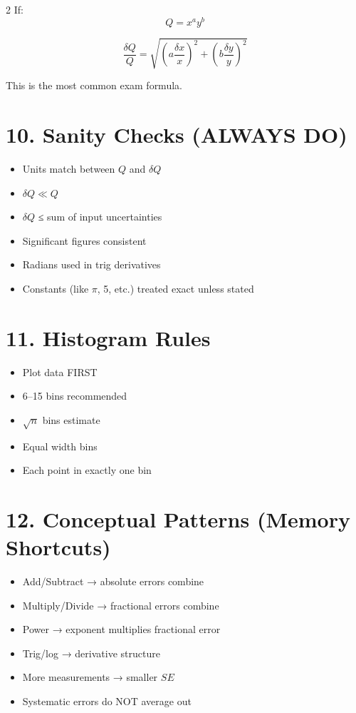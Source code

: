 \documentclass[10pt,landscape]{article}
\begin{document}
\begin{multicols}{2}
If:
\[
Q = x^a y^b
\]

\[
\boxed{
\frac{\delta Q}{Q} =
\sqrt{
\left(a\frac{\delta x}{x}\right)^2 +
\left(b\frac{\delta y}{y}\right)^2
}
}
\]

This is the most common exam formula.

\section*{10. Sanity Checks (ALWAYS DO)}

\begin{itemize}
\item Units match between $Q$ and $\delta Q$
\item $\delta Q \ll Q$
\item $\delta Q$ ≤ sum of input uncertainties
\item Significant figures consistent
\item Radians used in trig derivatives
\item Constants (like $\pi$, 5, etc.) treated exact unless stated
\end{itemize}

\section*{11. Histogram Rules}

\begin{itemize}
\item Plot data FIRST
\item 6–15 bins recommended
\item $\sqrt{n}$ bins estimate
\item Equal width bins
\item Each point in exactly one bin
\end{itemize}

\section*{12. Conceptual Patterns (Memory Shortcuts)}

\begin{itemize}
\item Add/Subtract → absolute errors combine
\item Multiply/Divide → fractional errors combine
\item Power → exponent multiplies fractional error
\item Trig/log → derivative structure
\item More measurements → smaller $SE$
\item Systematic errors do NOT average out
\end{itemize}


\end{multicols}
\end{document}

